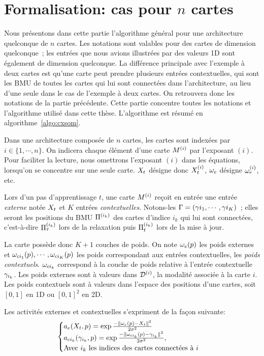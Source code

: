 \documentclass[../main]{subfiles}
\begin{document}
\section{Formalisation: cas pour $n$ cartes}\label{sec:formalisme}

Nous présentons dans cette partie l'algorithme général pour une architecture quelconque de $n$ cartes. 
Les notations sont valables pour des cartes de dimension quelconque~; les entrées que nous avions illustrées par des valeurs 1D sont également de dimension quelconque.
La différence principale avec l'exemple à deux cartes est qu'une carte peut prendre plusieurs entrées contextuelles, qui sont les BMU de toutes les cartes qui lui sont connectées dans l'architecture, au lieu d'une seule dans le cas de l'exemple à deux cartes. On retrouvera donc les notations de la partie précédente.
Cette partie concentre toutes les notations et l'algorithme utilisé dans cette thèse. 
L'algorithme est résumé en algorithme~\ref{algo:cxsom}.

Dans une architecture composée de $n$ cartes, les cartes sont indexées par $i \in \{1,\cdots,n\}$. On indicera chaque élément d'une carte $M^{({i})}$ par l'exposant $(i)$.
Pour faciliter la lecture, nous omettrons l'exposant $(i)$ dans les équations, lorsqu'on se concentre sur une seule carte. $X_t$ désigne donc $X_t^{({i})}$, $\omega_e$ désigne $\omega_e^{({i})}$, etc.

Lors d'un pas d'apprentissage $t$, une carte $M^{({i})}$ reçoit en entrée une entrée \emph{externe} notée $X_t$ et $K$ entrées \emph{contextuelles}. Notons-les $\Gamma = (\gamma{i_1},\cdots,\gamma{i_K})$~; elles seront les positions du BMU $\Pi^{({i_k})}$ des cartes d'indice $i_k$ qui lui sont connectées, c'est-à-dire $\Pi^{({i_k})}_\tau$ lors de la relaxation puis $\Pi^{({i_k})}_t$ lors de la mise à jour.

La carte possède donc $K+1$ couches de poids. On note $\omega_e(p)$ les poids externes et $\omega_{ci_1}(p), \cdots, \omega_{ci_K}(p)$ les poids correspondant aux entrées contextuelles, les \emph{poids contextuels}.
$\omega_{ci_k}$ correspond à la couche de poids relative à l'entrée contextuelle $\gamma_{i_k}$. Les poids externes sont à valeurs dans $\mathcal{D}^{({i})}$, la modalité associée à la carte $i$. Les poids contextuels sont à valeurs dans l'espace des positions d'une cartes, soit $[0,1]$ en 1D ou $[0,1]^2$ en 2D.

Les activités externes et contextuelles s'expriment de la façon suivante:
\begin{equation}
\label{eq:activite_general}
\begin{cases}
a_e(X_t,p) = \exp\frac{-\lVert \omega_e(p)-X_t \rVert^2}{2\sigma^2} \\
a_{ci_k}(\gamma_{i_k},p) = \exp\frac{-\lVert \omega_{ci_k}(p)-\gamma_{i_k} \rVert ^2}{2\sigma^2}, \\
\text{Avec $i_k$ les indices des cartes connectées à $i$}
\end{cases}
\end{equation}
\end{document}
